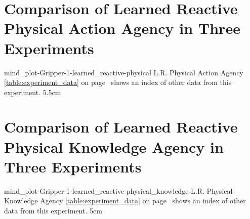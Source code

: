 {\clearpage
  \section{Comparison of Learned Reactive Physical Action Agency in Three Experiments}
  \experimentcausegroupplots{\dataappendixmaxtime}
                            {\dataappendixexperimentonemaxtime}
                            {\dataappendixexperimenttwomaxtime}
                            {\dataappendixexperimentthreemaxtime}
                            {\dataappendixexperimentonename}
                            {\dataappendixexperimenttwoname}
                            {\dataappendixexperimentthreename}
                            {\dataappendixexperimentoneprettyname}
                            {\dataappendixexperimenttwoprettyname}
                            \experimentcausegroupplotscontinued{\dataappendixexperimentthreeprettyname}
                                                               {mind_plot-Gripper-1-learned_reactive-physical}
                                                               {L.R. Physical Action Agency}
                                                               {  {\mbox{\autoref{table:experiment_data}}} on
                                                                 {\mbox{page~\pageref{table:experiment_data}}} shows an index of other data
                                                                 from this experiment.}
                                                               {5.5cm}
}
{\clearpage
  \section{Comparison of Learned Reactive Physical Knowledge Agency in Three Experiments}
  \experimentcausegroupplots{\dataappendixmaxtime}
                            {\dataappendixexperimentonemaxtime}
                            {\dataappendixexperimenttwomaxtime}
                            {\dataappendixexperimentthreemaxtime}
                            {\dataappendixexperimentonename}
                            {\dataappendixexperimenttwoname}
                            {\dataappendixexperimentthreename}
                            {\dataappendixexperimentoneprettyname}
                            {\dataappendixexperimenttwoprettyname}
                            \experimentcausegroupplotscontinued{\dataappendixexperimentthreeprettyname}
                                                               {mind_plot-Gripper-1-learned_reactive-physical_knowledge}
                                                               {L.R. Physical Knowledge Agency}
                                                               {  {\mbox{\autoref{table:experiment_data}}} on
                                                                 {\mbox{page~\pageref{table:experiment_data}}} shows an index of other data
                                                                 from this experiment.}
                                                               {5cm}
}
